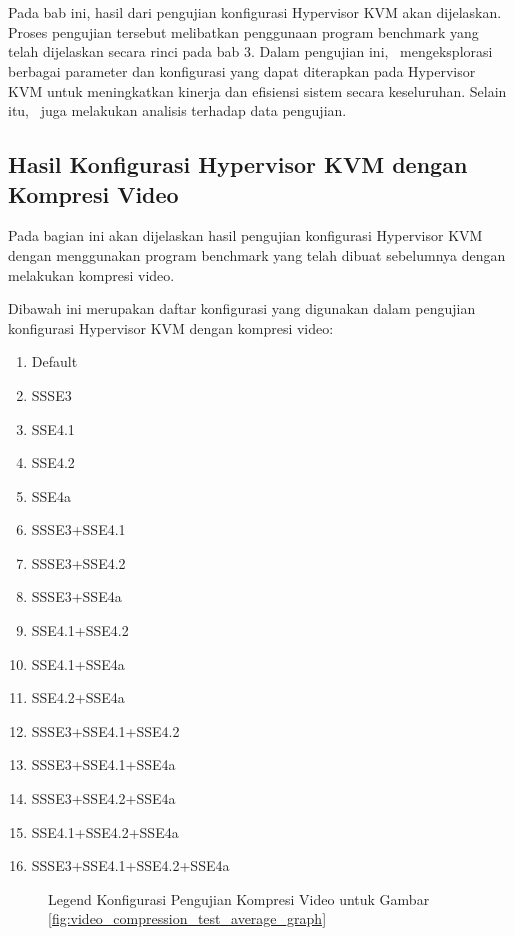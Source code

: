 \chapter{\babEmpat}
Pada bab ini, hasil dari pengujian konfigurasi Hypervisor KVM akan dijelaskan. Proses pengujian tersebut melibatkan penggunaan program benchmark yang telah dijelaskan secara rinci pada bab 3. Dalam pengujian ini, \saya\ mengeksplorasi berbagai parameter dan konfigurasi yang dapat diterapkan pada Hypervisor KVM untuk meningkatkan kinerja dan efisiensi sistem secara keseluruhan. Selain itu, \saya\ juga melakukan analisis terhadap data pengujian.

\section{Hasil Konfigurasi Hypervisor KVM dengan Kompresi Video}
Pada bagian ini akan dijelaskan hasil pengujian konfigurasi Hypervisor KVM dengan menggunakan program benchmark yang telah dibuat sebelumnya dengan melakukan kompresi video.

Dibawah ini merupakan daftar konfigurasi yang digunakan dalam pengujian konfigurasi Hypervisor KVM dengan kompresi video:

\begin{multicols}{2}
    \begin{enumerate}
        \item Default
        \item SSSE3
        \item SSE4.1
        \item SSE4.2
        \item SSE4a
        \item SSSE3+SSE4.1
        \item SSSE3+SSE4.2
        \item SSSE3+SSE4a
        \item SSE4.1+SSE4.2
        \item SSE4.1+SSE4a
        \item SSE4.2+SSE4a
        \item SSSE3+SSE4.1+SSE4.2
        \item SSSE3+SSE4.1+SSE4a
        \item SSSE3+SSE4.2+SSE4a
        \item SSE4.1+SSE4.2+SSE4a
        \item SSSE3+SSE4.1+SSE4.2+SSE4a
    \end{enumerate}
\end{multicols}
\begin{figure}
    \centering
    \caption{Legend Konfigurasi Pengujian Kompresi Video untuk Gambar \ref{fig:video_compression_test_average_graph}}
    \label{fig:video_compression_test_configuration}
\end{figure}

